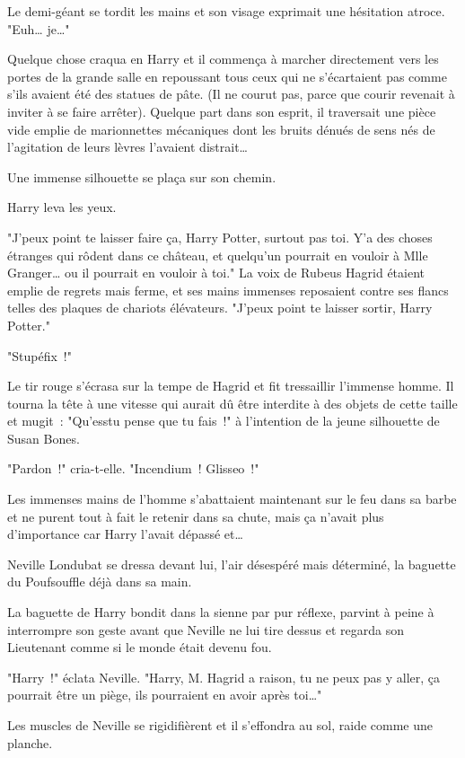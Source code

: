 Le demi-géant se tordit les mains et son visage exprimait une hésitation atroce. "Euh… je…"

Quelque chose craqua en Harry et il commença à marcher directement vers les portes de la grande salle en repoussant tous ceux qui ne s'écartaient pas comme s'ils avaient été des statues de pâte. (Il ne courut pas, parce que courir revenait à inviter à se faire arrêter). Quelque part dans son esprit, il traversait une pièce vide emplie de marionnettes mécaniques dont les bruits dénués de sens nés de l'agitation de leurs lèvres l'avaient distrait…

Une immense silhouette se plaça sur son chemin.

Harry leva les yeux.

"J'peux point te laisser faire ça, Harry Potter, surtout pas toi. Y'a des choses étranges qui rôdent dans ce château, et quelqu'un pourrait en vouloir à Mlle Granger… ou il pourrait en vouloir à toi." La voix de Rubeus Hagrid étaient emplie de regrets mais ferme, et ses mains immenses reposaient contre ses flancs telles des plaques de chariots élévateurs. "J'peux point te laisser sortir, Harry Potter."

"Stupéfix~!"

Le tir rouge s'écrasa sur la tempe de Hagrid et fit tressaillir l'immense homme. Il tourna la tête à une vitesse qui aurait dû être interdite à des objets de cette taille et mugit~: "Qu'esstu pense que tu fais~!" à l'intention de la jeune silhouette de Susan Bones.

"Pardon~!" cria-t-elle. "Incendium~! Glisseo~!"

Les immenses mains de l'homme s'abattaient maintenant sur le feu dans sa barbe et ne purent tout à fait le retenir dans sa chute, mais ça n'avait plus d'importance car Harry l'avait dépassé et…

Neville Londubat se dressa devant lui, l'air désespéré mais déterminé, la baguette du Poufsouffle déjà dans sa main.

La baguette de Harry bondit dans la sienne par pur réflexe, parvint à peine à interrompre son geste avant que Neville ne lui tire dessus et regarda son Lieutenant comme si le monde était devenu fou.

"Harry~!" éclata Neville. "Harry, M. Hagrid a raison, tu ne peux pas y aller, ça pourrait être un piège, ils pourraient en avoir après toi…"

Les muscles de Neville se rigidifièrent et il s'effondra au sol, raide comme une planche.

